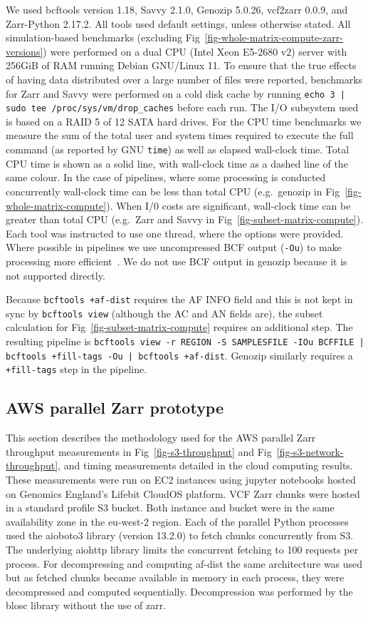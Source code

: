 \documentclass[a4paper,num-refs]{oup-contemporary}
\begin{document}
We used bcftools version 1.18, Savvy 2.1.0, Genozip 5.0.26,
vcf2zarr 0.0.9, and Zarr-Python 2.17.2.
All tools used default settings,
unless otherwise stated.
All simulation-based benchmarks (excluding Fig~\ref{fig-whole-matrix-compute-zarr-versions}) were performed on a
dual CPU (Intel Xeon E5-2680 v2)
server with 256GiB of RAM running Debian GNU/Linux 11.
To ensure that the true effects of having data distributed over a large
number of files were reported, benchmarks for Zarr and Savvy were
performed on a cold disk cache by running
\texttt{echo 3 | sudo tee /proc/sys/vm/drop\_caches} before each run.
The I/O subsystem used is based on a RAID 5 of 12 SATA hard drives.
For the CPU time benchmarks we measure the sum of the total user and
system times required to execute the full command (as reported by GNU
\texttt{time}) as well as elapsed wall-clock time. Total CPU
time is shown as a solid line, with wall-clock time as a dashed line
of the same colour. In the case of pipelines, where some processing
is conducted concurrently wall-clock time can be less than total
CPU (e.g.\ genozip in Fig~\ref{fig-whole-matrix-compute}).
When I/0 costs are significant, wall-clock time can be greater
than total CPU (e.g.\ Zarr and Savvy in Fig~\ref{fig-subset-matrix-compute}).
Each tool was instructed to use one thread, where the options
were provided.
Where possible in pipelines we use uncompressed BCF
output (\texttt{-Ou}) to make processing
more efficient~\citep{danecek2021twelve}.
We do not use BCF output in genozip because it is not supported
directly.

Because \texttt{bcftools +af-dist} requires the AF INFO field
and this is not kept in sync by \texttt{bcftools view}
(although the AC and AN fields are), the subset calculation
for Fig~\ref{fig-subset-matrix-compute} requires an additional step.
The resulting pipeline is
\texttt{bcftools view -r REGION -S SAMPLESFILE -IOu BCFFILE |
bcftools +fill-tags -Ou | bcftools +af-dist}. Genozip similarly
requires a \texttt{+fill-tags} step in the pipeline.

\subsection{AWS parallel Zarr prototype}
This section describes the methodology used for the AWS parallel Zarr
throughput measurements in Fig~\ref{fig-s3-throughput}
and Fig~\ref{fig-s3-network-throughput}, and timing measurements
detailed in the cloud computing results.
These measurements were run on EC2 instances using jupyter notebooks
hosted on Genomics England's Lifebit CloudOS platform. VCF Zarr chunks
were hosted in a standard profile S3 bucket. Both instance and bucket were
in the same availability zone in the eu-west-2 region. Each
of the parallel Python processes used the aioboto3 library (version 13.2.0) to
fetch chunks concurrently from S3. The underlying aiohttp library
limits the concurrent fetching to 100 requests per process. For decompressing
and computing af-dist the same architecture was used but as fetched chunks
became available in memory in each process, they were decompressed and
computed sequentially. Decompression was performed by the blosc library
without the use of zarr.
\end{document}
